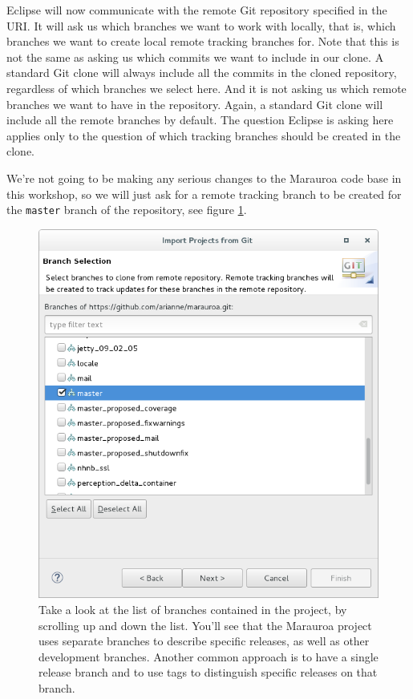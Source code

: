 \documentclass[
]{book}
\begin{document}
Eclipse will now communicate with the remote Git repository specified in the URI. It will ask us which branches we want to work with locally, that is, which branches we want to create local remote tracking branches for. Note that this is not the same as asking us which commits we want to include in our clone. A standard Git clone will always include all the commits in the cloned repository, regardless of which branches we select here. And it is not asking us which remote branches we want to have in the repository. Again, a standard Git clone will include all the remote branches by default. The question Eclipse is asking here applies only to the question of which tracking branches should be created in the clone.

We're not going to be making any serious changes to the Marauroa code base in this workshop, so we will just ask for a remote tracking branch to be created for the \texttt{master} branch of the repository, see figure \ref{fig:selectMarauroaBranches-fig}.

\begin{figure}

{\centering \includegraphics[width=1\linewidth]{images/1.4selectMarauroaBranches} 

}

\caption{Take a look at the list of branches contained in the project, by scrolling up and down the list. You'll see that the Marauroa project uses separate branches to describe specific releases, as well as other development branches. Another common approach is to have a single release branch and to use tags to distinguish specific releases on that branch.}\label{fig:selectMarauroaBranches-fig}
\end{figure}
\end{document}
